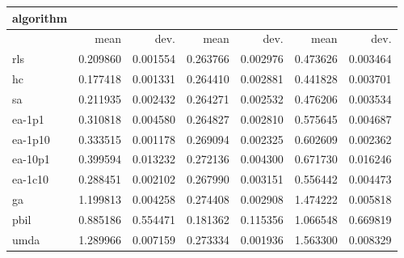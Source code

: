 \begin{tabular}{@{}l*{6}{>{{}}N{1}{2}}@{}}
\toprule
{algorithm} &  &  &  \\
\midrule
& {mean} & {dev.} & {mean} & {dev.} & {mean} & {dev.} \\
\midrule
rls & 0.209860 & 0.001554 & 0.263766 & 0.002976 & 0.473626 & 0.003464 \\
 hc & 0.177418 & 0.001331 & 0.264410 & 0.002881 & 0.441828 & 0.003701 \\
 sa & 0.211935 & 0.002432 & 0.264271 & 0.002532 & 0.476206 & 0.003534 \\
 ea-1p1 & 0.310818 & 0.004580 & 0.264827 & 0.002810 & 0.575645 & 0.004687 \\
 ea-1p10 & 0.333515 & 0.001178 & 0.269094 & 0.002325 & 0.602609 & 0.002362 \\
 ea-10p1 & 0.399594 & 0.013232 & 0.272136 & 0.004300 & 0.671730 & 0.016246 \\
 ea-1c10 & 0.288451 & 0.002102 & 0.267990 & 0.003151 & 0.556442 & 0.004473 \\
 ga & 1.199813 & 0.004258 & 0.274408 & 0.002908 & 1.474222 & 0.005818 \\
 pbil & 0.885186 & 0.554471 & 0.181362 & 0.115356 & 1.066548 & 0.669819 \\
 umda & 1.289966 & 0.007159 & 0.273334 & 0.001936 & 1.563300 & 0.008329 \\
 \bottomrule
\end{tabular}
